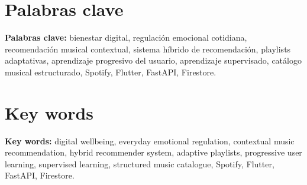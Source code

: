 \chapter*{Palabras clave}
{}

\noindent\textbf{Palabras clave:} bienestar digital, regulación emocional cotidiana, recomendación musical contextual, sistema híbrido de recomendación, playlists adaptativas, aprendizaje progresivo del usuario, aprendizaje supervisado, catálogo musical estructurado, Spotify, Flutter, FastAPI, Firestore.

\chapter*{Key words}
{}

\vspace{0.4cm}

\noindent\textbf{Key words:} digital wellbeing, everyday emotional regulation, contextual music recommendation, hybrid recommender system, adaptive playlists, progressive user learning, supervised learning, structured music catalogue, Spotify, Flutter, FastAPI, Firestore.
